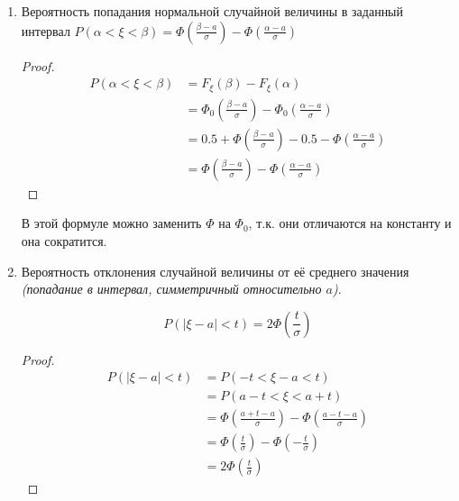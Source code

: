 \begin{enumerate}
    \item Вероятность попадания нормальной случайной величины в заданный интервал \(P(\alpha < \xi < \beta) = \Phi\left( \frac{\beta - a}{\sigma} \right) - \Phi\left( \frac{\alpha - a}{\sigma} \right)\)
          \begin{proof}
              \begin{align*}
                  P(\alpha < \xi < \beta) & = F_\xi(\beta) - F_\xi(\alpha)                                                                           \\
                                          & = \Phi_0\left( \frac{\beta - a}{\sigma} \right) - \Phi_0\left( \frac{\alpha - a}{\sigma} \right)         \\
                                          & = 0.5 + \Phi\left( \frac{\beta - a}{\sigma} \right) - 0.5 - \Phi\left( \frac{\alpha - a}{\sigma} \right) \\
                                          & = \Phi\left( \frac{\beta - a}{\sigma} \right) - \Phi\left( \frac{\alpha - a}{\sigma} \right)
              \end{align*}
          \end{proof}

          \begin{remark}
              В этой формуле можно заменить \(\Phi\) на \(\Phi_0\), т.к. они отличаются на константу и она сократится.
          \end{remark}

    \item Вероятность отклонения случайной величины от её среднего значения \textit{(попадание в интервал, симметричный относительно \(a\))}.

          \[P(|\xi - a| < t) = 2 \Phi\left( \frac{t}{\sigma} \right)\]

          \begin{proof}
              \begin{align*}
                  P(|\xi - a| < t) & = P( - t < \xi - a < t)                                                                     \\
                                   & = P(a - t < \xi < a + t)                                                                    \\
                                   & = \Phi\left( \frac{a + t - a}{\sigma} \right) - \Phi\left( \frac{a - t - a}{\sigma} \right) \\
                                   & = \Phi\left( \frac{t}{\sigma} \right) - \Phi\left( - \frac{t}{\sigma} \right)               \\
                                   & = 2\Phi\left( \frac{t}{\sigma} \right)
              \end{align*}
          \end{proof}


\end{enumerate}
